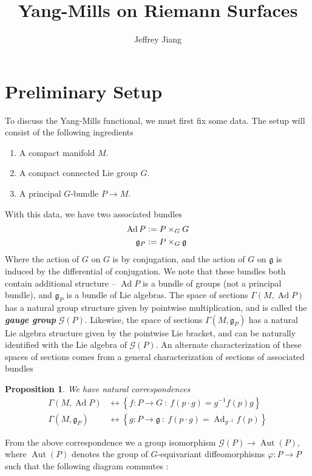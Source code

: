 \documentclass[psamsfonts, 12pt]{amsart}
\newtheorem{prop}[thm]{Proposition}
\theoremstyle{definition}
\theoremstyle{remark}
\newcommand{\ib}[1]{\textbf{\textit{#1}}}
\newcommand{\g}{\mathfrak{g}}
\newcommand{\inv}{^{-1}}
\newcommand{\set}[1]{\left\lbrace #1 \right\rbrace}
\newcommand{\defeq}{\vcentcolon=}
\DeclareMathOperator{\Aut}{Aut}
\DeclareMathOperator{\Ad}{Ad}
\begin{document}
%
\author{Jeffrey Jiang}
%
\title{Yang-Mills on Riemann Surfaces}
%
\maketitle
%
\tableofcontents
%
\section{Preliminary Setup}
%
To discuss the Yang-Mills functional, we must first fix some data. The setup will
consist of the following ingredients
\begin{enumerate}
  \item A compact manifold $M$.
  \item A compact connected Lie group $G$.
  \item A principal $G$-bundle $P \to M$.
\end{enumerate}
%
With this data, we have two associated bundles
\begin{align*}
\Ad P &\defeq P \times_G G \\
\g_P &\defeq P \times_G \g
\end{align*}
%
Where the action of $G$ on $G$ is by conjugation, and the action of $G$ on $\g$
is induced by the differential of conjugation. We note that these bundles both
contain additional structure -- $\Ad P$ is a bundle of groups (not a principal bundle),
and $\g_P$ is a bundle of Lie algebras. The space of sections $\Gamma(M, \Ad P)$ has
a natural group structure given by pointwise multiplication, and is called the
\ib{gauge group} $\mathscr{G}(P)$. Likewise, the space of sections
$\Gamma(M, \g_P)$ has a natural Lie algebra structure given by the pointwise Lie
bracket, and can be naturally identified with the Lie algebra of $\mathscr{G}(P)$.
An alternate characterization of these spaces of sections comes from a general
characterization of sections of associated bundles
%
\begin{prop}
We have natural correspondences
\begin{align*}
\Gamma(M, \Ad P) &\longleftrightarrow \set{f : P \to G ~:~ f(p\cdot g) = g\inv f(p)g} \\
\Gamma(M, \g_P) &\longleftrightarrow \set{g : P \to \g ~:~ f(p\cdot g) = \Ad_{g\inv}f(p)}
\end{align*}
\end{prop}
%
From the above correspondence we a group isomorphism
$\mathscr{G}(P) \to \Aut(P)$, where $\Aut(P)$ denotes the group of
$G$-equivariant diffeomorphisms $\varphi : P \to P$ such that
the following diagram commutes :
\end{document}
